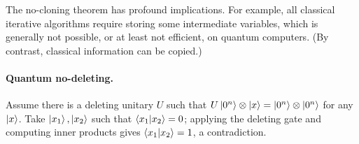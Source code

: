 \begin{remark}
The no-cloning theorem has profound implications. For example, all classical
iterative algorithms require storing some intermediate variables, which is
generally not possible, or at least not efficient, on quantum computers. (By
contrast, classical information can be copied.)
\end{remark}

\paragraph{Quantum no-deleting.}
Assume there is a deleting unitary $U$ such that
$U\ket{0^n} \otimes \ket{x} = \ket{0^n} \otimes \ket{0^n}$ for any $\ket{x}$. Take
$\ket{x_1}, \ket{x_2}$ such that $\braket{x_1|x_2} = 0$; applying the deleting gate
and computing inner products gives $\braket{x_1|x_2} = 1$, a contradiction.
